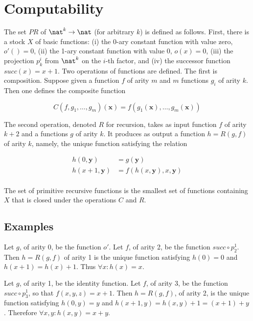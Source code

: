 \section{Computability}

The set $PR$ of  $\nat^k \to \nat$ (for arbitrary $k$) is defined as follows.  First, there is a stock $X$ of basic functions: (i) the 0-ary constant function with value zero, $o'() = 0$, (ii) the 1-ary constant function with value 0, $o(x) = 0$, (iii) the projection $p^i_k$ from $\nat^k$ on the $i$-th factor, and (iv) the successor function $succ(x) = x + 1$.  Two operations of functions are defined. The first is composition.  Suppose given a function $f$ of arity $m$ and $m$ functions $g_i$ of arity $k$.  Then one defines the composite function


\begin{equation}
C(f,g_1,\ldots,g_m)(\mathbold{x}) = f(g_1(\mathbold{x}), \ldots, g_m(\mathbold{x}))
\end{equation}

The second operation, denoted $R$ for recursion, takes as input  function $f$ of arity $k+2$ and a functions $g$ of arity $k$.  It produces as output a function $h = R(g,f)$ of arity $k$, namely, the unique function satisfying the relation

\begin{align}
  h(0, \mathbold{y}) &= g(\mathbold{y}) \\ 
  h(x + 1, \mathbold{y}) &= f(h(x,\mathbold{y}), x, \mathbold{y}) \\
\end{align}

\begin{definition}
The set of primitive recursive functions is the smallest set of functions containing $X$ that is closed under the operations $C$ and $R$.
\end{definition}

\subsection{Examples}


  Let $g$, of arity 0, be the function $o'$. Let $f$, of arity 2, be the function $succ \circ p^1_2$.  Then $h = R(g,f)$ of arity 1 is the unique function satisfying $h(0) = 0$ and $h(x+1) = h(x) + 1$.  Thus $\forall x: h(x) = x$.

 Let $g$, of arity 1,  be the identity function.   Let $f$, of arity 3, be the function $succ \circ p^1_3$, so that $f(x,y,z) = x + 1$.  Then $h = R(g,f)$, of arity 2, is the unique function satisfying $h(0,y) = y$ and $h(x+1,y) = h(x,y) + 1 = (x+1) + y$.  Therefore $\forall x,y: h(x,y) = x + y$.

